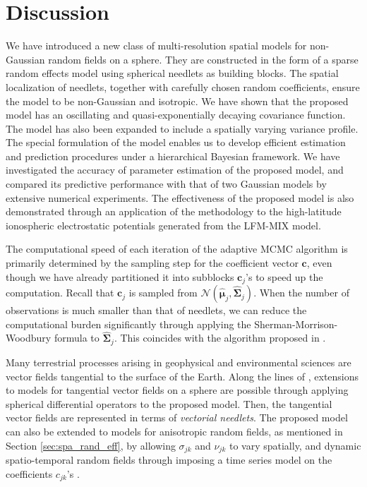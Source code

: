 \documentclass[aoas,preprint]{imsart}
\numberwithin{equation}{section}
\theoremstyle{plain}
\begin{document}
\section{Discussion}\label{sec:discuss}
We have introduced a new class of multi-resolution spatial models for non-Gaussian  random fields on a sphere. They are constructed in the form of a sparse random effects model using spherical needlets as building blocks. The spatial localization of needlets, together with carefully chosen random coefficients, ensure the model to be non-Gaussian and isotropic. We have shown that the proposed model has an oscillating and quasi-exponentially decaying covariance function. The model has also been expanded to include a spatially varying variance profile.  The special formulation of the model enables us to develop efficient estimation and prediction procedures under a hierarchical Bayesian framework. We have investigated the accuracy of parameter estimation of the proposed model, and compared its predictive performance with that of two Gaussian models by extensive numerical experiments. The effectiveness of the proposed model is also demonstrated through an application of the methodology to the high-latitude ionospheric electrostatic potentials generated from the LFM-MIX model.

The computational speed of each iteration of the adaptive MCMC algorithm is primarily determined by the sampling step for the coefficient vector $\mathbf{c}$, even though we have already partitioned it into subblocks $\mathbf{c}_j$'s to speed up the computation. Recall that $\mathbf{c}_j$ is sampled from $\mathcal{N}(\hat{\bm{\mu}}_j, \widehat{\mathbf{\Sigma}}_j)$. When the number of observations is much smaller than that of needlets, we can reduce the computational burden significantly through applying the Sherman-Morrison-Woodbury formula to $\widehat{\mathbf{\Sigma}}_j$. This coincides with the algorithm proposed in \citet{Bhattacharya-16}.

Many terrestrial processes arising in geophysical and environmental sciences are vector fields tangential to the surface of the Earth. Along the lines of \citet{Fan-16}, extensions to models for tangential vector fields on a sphere are possible through applying spherical differential operators to the proposed model. Then, the tangential vector fields are represented in terms of \textit{vectorial needlets}. The proposed model can also be extended to models for anisotropic random fields, as mentioned in Section \ref{sec:spa_rand_eff}, by allowing $\sigma_{jk}$ and $\nu_{jk}$ to vary spatially, and dynamic spatio-temporal random fields through imposing a time series model on the coefficients $c_{jk}$'s \citep{Cressie-10}.
\end{document}
